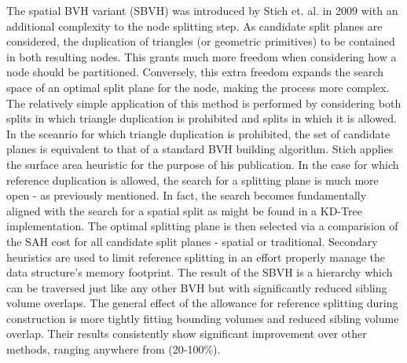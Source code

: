 \documentclass[12pt, a4paper]{article}
\begin{document}
The spatial BVH variant (SBVH) was introduced by Stich et. al. in 2009 \cite{Stich_2009} with an additional complexity to the node splitting step. As candidate split planes are considered, the duplication of triangles (or geometric primitives) to be contained in both resulting nodes. This grants much more freedom when considering how a node should be partitioned. Conversely, this extra freedom expands the search space of an optimal split plane for the node, making the process more complex. The relatively simple application of this method is performed by considering both splits in which triangle duplication is prohibited and splits in which it is allowed. In the sceanrio for which triangle duplication is prohibited, the set of candidate planes is equivalent to that of a standard BVH building algorithm. Stich applies the surface area heuristic for the purpose of his publication. In the case for which reference duplication is allowed, the search for a splitting plane is much more open - as previously mentioned. In fact, the search becomes fundamentally aligned with the search for a spatial split as might be found in a KD-Tree implementation. The optimal splitting plane is then selected via a comparision of the SAH cost for all candidate split planes - spatial or traditional. Secondary heuristics are used to limit reference splitting in an effort properly manage the data structure's memory footprint. The result of the SBVH is a hierarchy which can be traversed just like any other BVH but with significantly reduced sibling volume overlaps. The general effect of the allowance for reference splitting during construction is more tightly fitting bounding volumes and reduced sibling volume overlap. Their results consistently show significant improvement over other methods, ranging anywhere from (20-100\%).\cite{Stich_2009}

\end{document}
